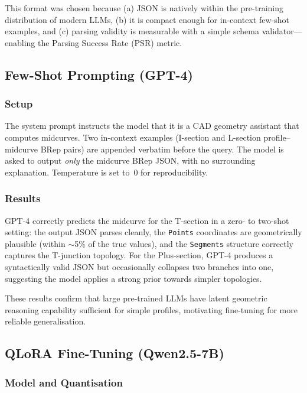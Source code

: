 \documentclass[journal]{IEEEtran}
\begin{document}
This format was chosen because (a) JSON is natively within the pre-training
distribution of modern LLMs, (b) it is compact enough for in-context few-shot
examples, and (c) parsing validity is measurable with a simple schema
validator—enabling the Parsing Success Rate (PSR) metric.

\subsection{Few-Shot Prompting (GPT-4)}
\label{sec:phase2_prompt}

\subsubsection{Setup}

The system prompt instructs the model that it is a CAD geometry assistant that
computes midcurves.  Two in-context examples (I-section and L-section
profile--midcurve BRep pairs) are appended verbatim before the query.  The
model is asked to output \emph{only} the midcurve BRep JSON, with no
surrounding explanation.  Temperature is set to~0 for reproducibility.

\subsubsection{Results}

GPT-4 correctly predicts the midcurve for the T-section in a zero- to two-shot
setting: the output JSON parses cleanly, the \texttt{Points} coordinates are
geometrically plausible (within $\sim$5\% of the true values), and the
\texttt{Segments} structure correctly captures the T-junction topology.  For
the Plus-section, GPT-4 produces a syntactically valid JSON but occasionally
collapses two branches into one, suggesting the model applies a strong
prior towards simpler topologies.

These results confirm that large pre-trained LLMs have latent geometric
reasoning capability sufficient for simple profiles, motivating fine-tuning
for more reliable generalisation.

\subsection{QLoRA Fine-Tuning (Qwen2.5-7B)}
\label{sec:phase2_qlora}

\subsubsection{Model and Quantisation}
\end{document}
